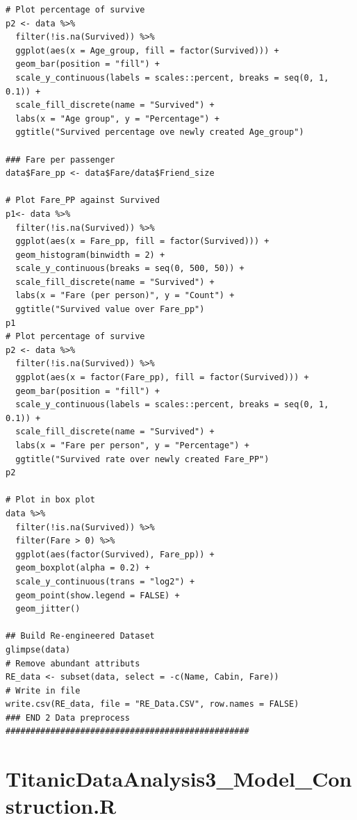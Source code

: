 \documentclass[
]{book}
\begin{document}
\begin{verbatim}
# Plot percentage of survive
p2 <- data %>%
  filter(!is.na(Survived)) %>%
  ggplot(aes(x = Age_group, fill = factor(Survived))) +
  geom_bar(position = "fill") +
  scale_y_continuous(labels = scales::percent, breaks = seq(0, 1, 0.1)) +
  scale_fill_discrete(name = "Survived") +
  labs(x = "Age group", y = "Percentage") +
  ggtitle("Survived percentage ove newly created Age_group")

### Fare per passenger
data$Fare_pp <- data$Fare/data$Friend_size

# Plot Fare_PP against Survived
p1<- data %>%
  filter(!is.na(Survived)) %>%
  ggplot(aes(x = Fare_pp, fill = factor(Survived))) +
  geom_histogram(binwidth = 2) +
  scale_y_continuous(breaks = seq(0, 500, 50)) +
  scale_fill_discrete(name = "Survived") +
  labs(x = "Fare (per person)", y = "Count") +
  ggtitle("Survived value over Fare_pp")
p1
# Plot percentage of survive
p2 <- data %>%
  filter(!is.na(Survived)) %>%
  ggplot(aes(x = factor(Fare_pp), fill = factor(Survived))) +
  geom_bar(position = "fill") +
  scale_y_continuous(labels = scales::percent, breaks = seq(0, 1, 0.1)) +
  scale_fill_discrete(name = "Survived") +
  labs(x = "Fare per person", y = "Percentage") +
  ggtitle("Survived rate over newly created Fare_PP")
p2

# Plot in box plot
data %>%
  filter(!is.na(Survived)) %>%
  filter(Fare > 0) %>%
  ggplot(aes(factor(Survived), Fare_pp)) +
  geom_boxplot(alpha = 0.2) +
  scale_y_continuous(trans = "log2") +
  geom_point(show.legend = FALSE) +
  geom_jitter()

## Build Re-engineered Dataset
glimpse(data)
# Remove abundant attributs
RE_data <- subset(data, select = -c(Name, Cabin, Fare))
# Write in file
write.csv(RE_data, file = "RE_Data.CSV", row.names = FALSE)
### END 2 Data preprocess #################################################
\end{verbatim}

\hypertarget{titanicdataanalysis3_model_construction.r}{%
\section*{TitanicDataAnalysis3\_Model\_Construction.R}\label{titanicdataanalysis3_model_construction.r}}
\end{document}
